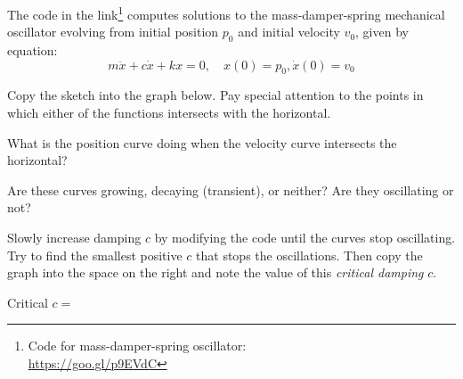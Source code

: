 \newpage\begin{sagequestion}
  The \sage code in the link\footnote{Code for mass-damper-spring oscillator: \\ \url{https://goo.gl/p9EVdC}} computes solutions to the mass-damper-spring mechanical oscillator evolving from initial position \(p_{0}\) and initial velocity \(v_{0}\), given by equation:
  \begin{equation}
    \label{eq:w5-1}
    m \ddot x + c \dot x + k x = 0,\quad x(0)=p_{0}, \dot x(0) = v_{0}
  \end{equation}

  \begin{enumerate}[(a)]

  \item Copy the sketch into the graph below. Pay special attention to the
    points in which either of the functions intersects with the horizontal.

    \begin{minipage}{0.48\linewidth}
  \end{minipage}
    \begin{minipage}{0.48\linewidth}
  \item What is the position curve doing when the velocity curve intersects the horizontal?
  \solspace{0.25in}

\item Are these curves growing, decaying (transient), or neither? Are they oscillating or not?
  \solspace{0.25in}
\end{minipage}

\begin{minipage}{0.48\linewidth}
\item Slowly increase damping \(c\) by modifying the code until the curves stop oscillating. Try to find the smallest positive \(c\) that stops the oscillations. Then copy the graph into the space on the right and note the value of this \emph{critical damping} \(c\).
\end{minipage} \begin{minipage}{0.48\linewidth}
\begin{center}

    \vspace{1em}
        Critical \(c = \)
    \end{center}
  \end{minipage}
\end{enumerate}

\end{sagequestion}

